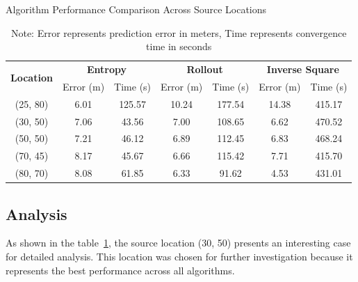 \documentclass[../report.tex]{subfiles}
\begin{document}
    \begin{table}[htbp]
        \centering
        \caption{Algorithm Performance Comparison Across Source Locations}
        \label{tab:algorithm_comparison}
        \setlength{\tabcolsep}{4pt}  %
        \begin{tabular}{|c|cc|cc|cc|}
                \hline
                \multirow{2}{*}{\textbf{Location}} & \multicolumn{2}{c|}{\textbf{Entropy}} & \multicolumn{2}{c|}{\textbf{Rollout}} & \multicolumn{2}{c|}{\textbf{Inverse Square}} \\
                \cline{2-7}
                & Error (m) & Time (s) & Error (m) & Time (s) & Error (m) & Time (s) \\
                \hline
                (25, 80) & 6.01 & 125.57 & 10.24 & 177.54 & 14.38 & 415.17 \\
                \rowcolor{gray!20}
                (30, 50) & 7.06 & 43.56 & 7.00 & 108.65 & 6.62 & 470.52 \\
                (50, 50) & 7.21 & 46.12 & 6.89 & 112.45 & 6.83 & 468.24 \\
                (70, 45) & 8.17 & 45.67 & 6.66 & 115.42 & 7.71 & 415.70 \\
                (80, 70) & 8.08 & 61.85 & 6.33 & 91.62 & 4.53 & 431.01 \\
                \hline
            \end{tabular}
            \caption*{Note: Error represents prediction error in meters, Time represents convergence time in seconds}
        \end{table}
    \subsection{Analysis}

    As shown in the table~\ref{tab:algorithm_comparison}, the source location (30, 50) presents an interesting case for detailed analysis. This location was chosen for further 
    investigation because it represents the best performance across all algorithms. 
    
    
    
\end{document}
